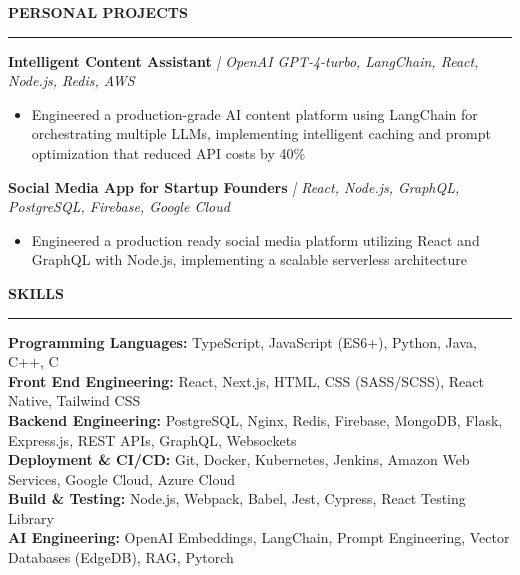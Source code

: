 \documentclass[10pt,letterpaper]{article}
\begin{document}
\vspace{2mm}
{\hspace{0in}\small\textbf{PERSONAL PROJECTS}}\par
\vspace{-2mm}
\noindent\rule{\textwidth}{0.1pt}
\vspace{-4mm}

\hspace{0in}\textbf{Intelligent Content Assistant} \textit{| OpenAI GPT-4-turbo, LangChain, React, Node.js, Redis, AWS}
\begin{itemize}[leftmargin=0.15in,nosep,topsep=1pt]
    \item Engineered a production-grade AI content platform using LangChain for orchestrating multiple LLMs, implementing intelligent caching and prompt optimization that reduced API costs by 40\%
\end{itemize}

\hspace{0in}\textbf{Social Media App for Startup Founders} \textit{| React, Node.js, GraphQL, PostgreSQL, Firebase, Google Cloud}
\begin{itemize}[leftmargin=0.15in,nosep,topsep=1pt]
    \item Engineered a production ready social media platform utilizing React and GraphQL with Node.js, implementing a scalable serverless architecture
\end{itemize}

\vspace{2mm}
{\hspace{0in}\small\textbf{SKILLS}}\par
\vspace{-2mm}
\noindent\rule{\textwidth}{0.1pt}
\vspace{-4mm}

\hspace{0in}\textbf{Programming Languages:} TypeScript, JavaScript (ES6+), Python, Java, C++, C\\
\hspace{0.25in}\textbf{Front End Engineering:} React, Next.js, HTML, CSS (SASS/SCSS), React Native, Tailwind CSS\\
\hspace{0.25in}\textbf{Backend Engineering:} PostgreSQL, Nginx, Redis, Firebase, MongoDB, Flask, Express.js, REST APIs, GraphQL, Websockets\\
\hspace{0.25in}\textbf{Deployment \& CI/CD:} Git, Docker, Kubernetes, Jenkins, Amazon Web Services, Google Cloud, Azure Cloud\\
\hspace{0.25in}\textbf{Build \& Testing:} Node.js, Webpack, Babel, Jest, Cypress, React Testing Library\\
\hspace{0.25in}\textbf{AI Engineering:} OpenAI Embeddings, LangChain, Prompt Engineering, Vector Databases (EdgeDB), RAG, Pytorch
\end{document}
